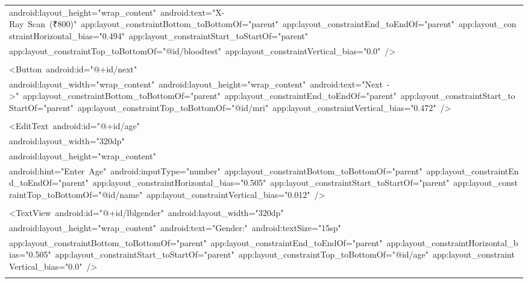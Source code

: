 \documentclass[a4paper,12pt]{article}
\begin{document}
\begin{longtable}{|p{}|}
{\ttfamily\small android:layout\_height="wrap\_content"\ android:text="X-Ray\ Scan\ (₹800)"\ app:layout\_constraintBottom\_toBottomOf="parent"\ app:layout\_constraintEnd\_toEndOf="parent"\ app:layout\_constraintHorizontal\_bias="0.494"\ app:layout\_constraintStart\_toStartOf="parent"} \\
{\ttfamily\small app:layout\_constraintTop\_toBottomOf="@id/bloodtest"\ app:layout\_constraintVertical\_bias="0.0"\ /\textgreater{}} \\
\strut \\
{\ttfamily\small \textless{}Button\ android:id="@+id/next"} \\
{\ttfamily\small android:layout\_width="wrap\_content"\ android:layout\_height="wrap\_content"\ android:text="Next\ -\textgreater{}"\ app:layout\_constraintBottom\_toBottomOf="parent"\ app:layout\_constraintEnd\_toEndOf="parent"\ app:layout\_constraintStart\_toStartOf="parent"\ app:layout\_constraintTop\_toBottomOf="@id/mri"\ app:layout\_constraintVertical\_bias="0.472"\ /\textgreater{}} \\
\strut \\
{\ttfamily\small \textless{}EditText\ android:id="@+id/age"} \\
{\ttfamily\small android:layout\_width="320dp"} \\
{\ttfamily\small android:layout\_height="wrap\_content"} \\
{\ttfamily\small android:hint="Enter\ Age"\ android:inputType="number"\ app:layout\_constraintBottom\_toBottomOf="parent"\ app:layout\_constraintEnd\_toEndOf="parent"\ app:layout\_constraintHorizontal\_bias="0.505"\ app:layout\_constraintStart\_toStartOf="parent"\ app:layout\_constraintTop\_toBottomOf="@id/name"\ app:layout\_constraintVertical\_bias="0.012"\ /\textgreater{}} \\
\strut \\
{\ttfamily\small \textless{}TextView\ android:id="@+id/lblgender"\ android:layout\_width="320dp"} \\
{\ttfamily\small android:layout\_height="wrap\_content"\ android:text="Gender:"\ android:textSize="15sp"} \\
{\ttfamily\small app:layout\_constraintBottom\_toBottomOf="parent"\ app:layout\_constraintEnd\_toEndOf="parent"\ app:layout\_constraintHorizontal\_bias="0.505"\ app:layout\_constraintStart\_toStartOf="parent"\ app:layout\_constraintTop\_toBottomOf="@id/age"\ app:layout\_constraintVertical\_bias="0.0"\ /\textgreater{}} \\
\strut \\

\end{longtable}
\end{document}
